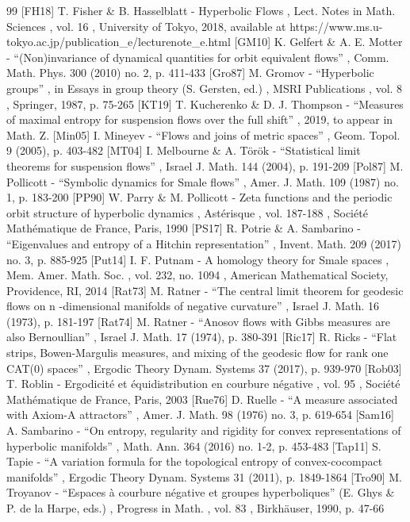 \documentclass[11pt]{article}
\theoremstyle{definition}
\numberwithin{equation}{section}
\begin{document}
\begin{thebibliography}{99}
 [FH18] T. Fisher \& B. Hasselblatt - Hyperbolic Flows , Lect. Notes in Math. Sciences , vol. 16 , University of Tokyo, 2018, available at https://www.ms.u-tokyo.ac.jp/publication\_e/lecturenote\_e.html
 [GM10] K. Gelfert \& A. E. Motter - “(Non)invariance of dynamical quantities for orbit equivalent flows” , Comm. Math. Phys. 300 (2010) no. 2, p. 411-433
 [Gro87] M. Gromov - “Hyperbolic groups” , in Essays in group theory (S. Gersten, ed.) , MSRI Publications , vol. 8 , Springer, 1987, p. 75-265
 [KT19] T. Kucherenko \& D. J. Thompson - “Measures of maximal entropy for suspension flows over the full shift” , 2019, to appear in Math. Z.
 [Min05] I. Mineyev - “Flows and joins of metric spaces” , Geom. Topol. 9 (2005), p. 403-482
 [MT04] I. Melbourne \& A. Török - “Statistical limit theorems for suspension flows” , Israel J. Math. 144 (2004), p. 191-209
 [Pol87] M. Pollicott - “Symbolic dynamics for Smale flows” , Amer. J. Math. 109 (1987) no. 1, p. 183-200
 [PP90] W. Parry \& M. Pollicott - Zeta functions and the periodic orbit structure of hyperbolic dynamics , Astérisque , vol. 187-188 , Société Mathématique de France, Paris, 1990
 [PS17] R. Potrie \& A. Sambarino - “Eigenvalues and entropy of a Hitchin representation” , Invent. Math. 209 (2017) no. 3, p. 885-925
 [Put14] I. F. Putnam - A homology theory for Smale spaces , Mem. Amer. Math. Soc. , vol. 232, no. 1094 , American Mathematical Society, Providence, RI, 2014
 [Rat73] M. Ratner - “The central limit theorem for geodesic flows on n -dimensional manifolds of negative curvature” , Israel J. Math. 16 (1973), p. 181-197
 [Rat74] M. Ratner - “Anosov flows with Gibbs measures are also Bernoullian” , Israel J. Math. 17 (1974), p. 380-391
 [Ric17] R. Ricks - “Flat strips, Bowen-Margulis measures, and mixing of the geodesic flow for rank one CAT(0) spaces” , Ergodic Theory Dynam. Systems 37 (2017), p. 939-970
 [Rob03] T. Roblin - Ergodicité et équidistribution en courbure négative , vol. 95 , Société Mathématique de France, Paris, 2003
 [Rue76] D. Ruelle - “A measure associated with Axiom-A attractors” , Amer. J. Math. 98 (1976) no. 3, p. 619-654
 [Sam16] A. Sambarino - “On entropy, regularity and rigidity for convex representations of hyperbolic manifolds” , Math. Ann. 364 (2016) no. 1-2, p. 453-483
 [Tap11] S. Tapie - “A variation formula for the topological entropy of convex-cocompact manifolds” , Ergodic Theory Dynam. Systems 31 (2011), p. 1849-1864
 [Tro90] M. Troyanov - “Espaces à courbure négative et groupes hyperboliques” (E. Ghys \& P. de la Harpe, eds.) , Progress in Math. , vol. 83 , Birkhäuser, 1990, p. 47-66
\end{thebibliography}
\end{document}
